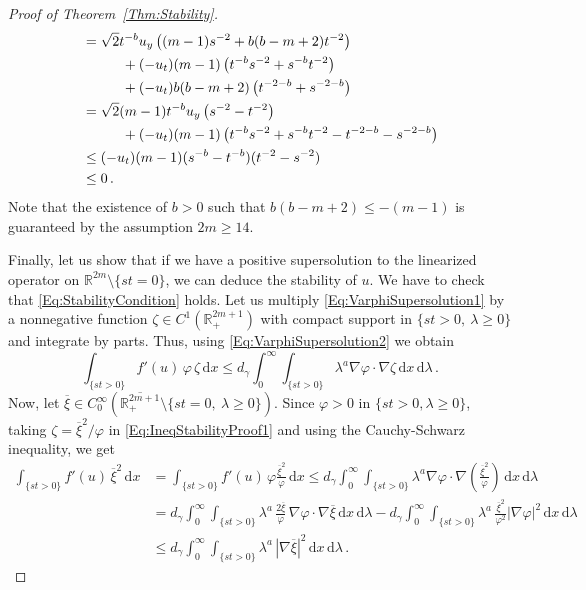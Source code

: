 \documentclass[12pt,reqno]{amsart}
\theoremstyle{definition}
\theoremstyle{remark}
\newcommand{\con}[1]{\mathbb{#1}}
\newcommand{\R}{\con{R}} %
\newcommand{\s}{\gamma}
\renewcommand{\d}{\,\mathrm{d}} %
\numberwithin{equation}{section}
\begin{document}
\begin{proof}[Proof of Theorem~\ref{Thm:Stability}]
\begin{align*}
&= \sqrt{2} t^{-b} u_y \left( (m-1) s^{-2} + b(b-m+2) t^{-2}\right) \\
& \hspace{10mm} + (-u_t) (m-1) \left( t^{-b} s^{-2} + s^{-b} t^{-2} \right) \\
& \hspace{10mm} + (-u_t) b (b-m+2) \left( t^{-2-b} + s^{-2-b} \right) \\
&= \sqrt{2} (m-1) t^{-b} u_y \left( s^{-2} - t^{-2}\right) \\
& \hspace{10mm} + (-u_t) (m-1) \left( t^{-b} s^{-2} + s^{-b} t^{-2} - t^{-2-b} - s^{-2-b} \right) \\
& \leq (-u_t) (m-1) (s^{-b}-t^{-b}) (t^{-2}-s^{-2}) \\
& \leq 0\,.
\end{align*}
Note that the existence of $b>0$ such that $b(b-m+2)\leq -(m-1)$ is guaranteed by the assumption $2m\geq 14$.




Finally, let us show that if we have a positive supersolution to the linearized operator on $\R^{2m}\setminus \{st=0\}$, we can deduce the stability of $u$. We have to check that \eqref{Eq:StabilityCondition} holds. Let us multiply \eqref{Eq:VarphiSupersolution1} by a nonnegative function $\zeta\in C^1(\R^{2m+1}_+)$ with compact support in $\{st>0, \ \lambda \geq0\}$ and integrate by parts. Thus, using \eqref{Eq:VarphiSupersolution2} we obtain
\begin{equation}
	\label{Eq:IneqStabilityProof1}	
	\int_{\{st>0\}} f'(u) \, \varphi \, \zeta  \d x \leq d_\s \int_0^\infty \int_{\{st>0\}} \lambda^a \nabla{\varphi} \cdot \nabla{\zeta}  \d x \d \lambda\,.
\end{equation}
Now, let $\overline{\xi} \in C^\infty_0(\overline{\R^{2m+1}_+}\setminus \{st=0, \ \lambda \geq 0\})$. Since $\varphi > 0$ in $\{st>0, \lambda \geq 0\}$, taking $\zeta = \overline{\xi}^2/\varphi$ in \eqref{Eq:IneqStabilityProof1} and using the Cauchy-Schwarz inequality, we get
\begin{align*}
\int_{\{st>0\}}  \! f'(u)\,\overline{\xi}^2 \d x &= \int_{\{st>0\}} \! f'(u)\,\varphi \frac{\overline{\xi}^2}{\varphi} \d x \leq d_\s \int_0^\infty \! \!  \int_{\{st>0\}} \! \lambda^a \nabla{\varphi} \cdot \nabla{\left(\frac{\overline{\xi}^2}{\varphi}\right)} \d x \d \lambda \\
&= d_\s \int_0^\infty \! \! \int_{\{st>0\}}\!  \lambda^a\,\frac{2\overline{\xi}}{\varphi} \,\nabla \varphi\cdot \nabla \overline{\xi}  \d x \d \lambda - d_\s \int_0^\infty \! \!  \int_{\{st>0\}} \!  \lambda^a\,\frac{\overline{\xi}^2}{\varphi^2}|\nabla \varphi|^2  \d x \d \lambda \\
&\leq d_\s \int_0^\infty \! \! \int_{\{st>0\}} \! \lambda^a\,|\nabla \overline{\xi}|^2  \d x \d \lambda\,.
\end{align*}



\end{proof}
\end{document}
